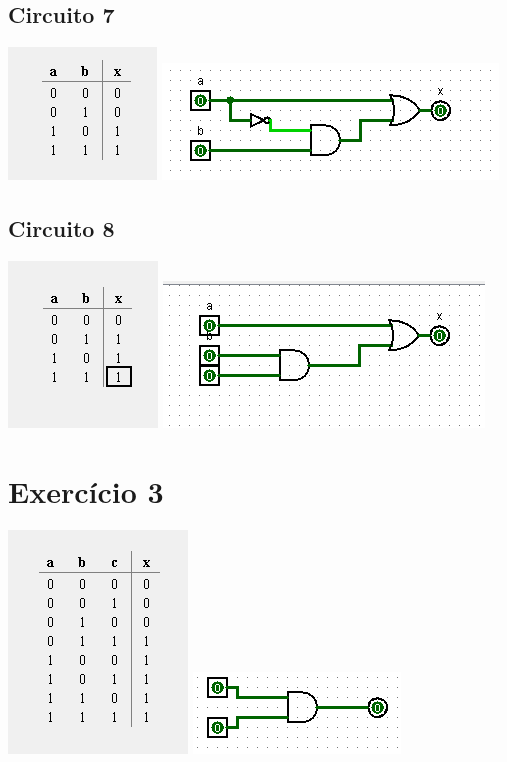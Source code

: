 \documentclass[12pt]{article}
\begin{document}
\subsection{Circuito 7}
    \includegraphics{./images/circuito06_table.png}
\includegraphics{./images/circuito07.png}
\subsection{Circuito 8}
    \includegraphics{./images/circuito07_table.png}
\includegraphics{./images/circuito08.png}
\section{Exercício 3}
    \includegraphics{./images/circuito08_table.png}
\includegraphics{./images/circuito09.png}
\end{document}
